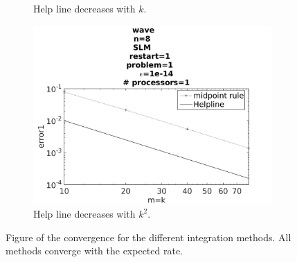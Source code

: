 \begin{figure}[H]
\begin{subfigure}[b]{0.30\textwidth}
                \caption{ Help line decreases with $k$. }
                \label{fig:intconveul}
        \end{subfigure}
        \begin{subfigure}[b]{0.30\textwidth}
                \includegraphics[width=\textwidth]{../MATLAB/fig/intconvmid.jpg}
                \caption{ Help line decreases with $k^2$. }
                \label{fig:intconvmid}
        \end{subfigure}
        
        
\caption{Figure of the convergence for the different integration methods. All methods converge with the expected rate.}
\label{fig:intconv}
\end{figure}

